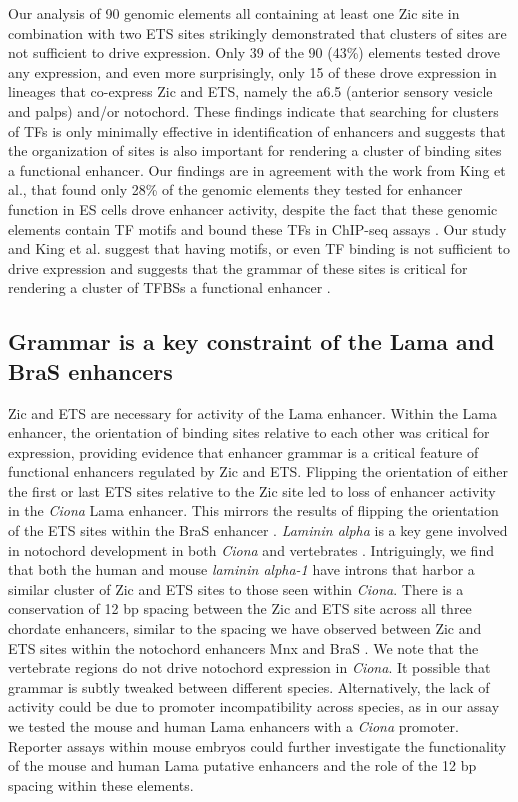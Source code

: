 Our analysis of 90 genomic elements all containing at least one Zic site in combination with two ETS sites strikingly demonstrated that clusters of sites are not sufficient to drive expression. Only 39 of the 90 (43\%) elements tested drove any expression, and even more surprisingly, only 15 of these drove expression in lineages that co-express Zic and ETS, namely the a6.5 (anterior sensory vesicle and palps) and/or notochord. These findings indicate that searching for clusters of TFs is only minimally effective in identification of enhancers and suggests that the organization of sites is also important for rendering a cluster of binding sites a functional enhancer. Our findings are in agreement with the work from King et al., that found only 28\% of the genomic elements they tested for enhancer function in ES cells drove enhancer activity, despite the fact that these genomic elements contain TF motifs and bound these TFs in ChIP-seq assays \cite{king2020a}. Our study and King et al. suggest that having motifs, or even TF binding is not sufficient to drive expression and suggests that the grammar of these sites is critical for rendering a cluster of TFBSs a functional enhancer \cite{king2020a}. 

\subsection{Grammar is a key constraint of the Lama and BraS enhancers} 

Zic and ETS are necessary for activity of the Lama enhancer. Within the Lama enhancer, the orientation of binding sites relative to each other was critical for expression, providing evidence that enhancer grammar is a critical feature of functional enhancers regulated by Zic and ETS. Flipping the orientation of either the first or last ETS sites relative to the Zic site led to loss of enhancer activity in the \textit{Ciona} Lama enhancer. This mirrors the results of flipping the orientation of the ETS sites within the BraS enhancer \cite{farley2016}. \textit{Laminin alpha} is a key gene involved in notochord development in both \textit{Ciona} and vertebrates \cite{pollard2006,veeman2008}. Intriguingly, we find that both the human and mouse \textit{laminin alpha-1} have introns that harbor a similar cluster of Zic and ETS sites to those seen within \textit{Ciona}. There is a conservation of 12 bp spacing between the Zic and ETS site across all three chordate enhancers, similar to the spacing we have observed between Zic and ETS sites within the notochord enhancers Mnx and BraS \cite{farley2016}. We note that the vertebrate regions do not drive notochord expression in \textit{Ciona}. It possible that grammar is subtly tweaked between different species. Alternatively, the lack of activity could be due to promoter incompatibility across species, as in our assay we tested the mouse and human Lama enhancers with a \textit{Ciona} promoter. Reporter assays within mouse embryos could further investigate the functionality of the mouse and human Lama putative enhancers and the role of the 12 bp spacing within these elements.   

